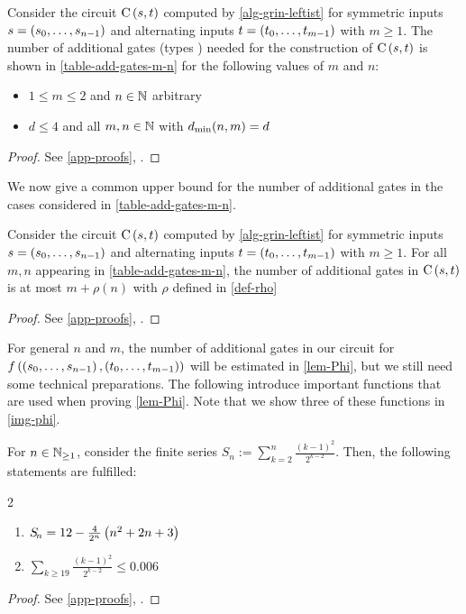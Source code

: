 \begin{lemma} \label{size-small-values}
Consider the circuit $\operatorname{C}\left({s, t}\right)$ computed by \cref{alg-grin-leftist}
for symmetric inputs $s = \left({s_0, \dotsc, s_{n-1}}\right)$ and alternating inputs $t = \left({t_0, \dotsc, t_{m-1}}\right)$
with $m \geq 1$.
The number of additional gates (types ) needed
for the construction of $\operatorname{C}\left({s, t}\right)$ is shown in \cref{table-add-gates-m-n}
for the following values of $m$ and $n$:
\begin{itemize}
 \item $1 \leq m \leq 2$ and $n \in \mathbb N$ arbitrary
 \item $d \leq 4$ and all $m, n \in \mathbb N$ with $d_{\min}(n, m) = d$
\end{itemize}
\begin{proof}
 See \cref{app-proofs}, .
\end{proof}
\end{lemma}

We now give a common upper bound for the number of additional gates
in the cases considered in \cref{table-add-gates-m-n}.

\begin{corollary} \label{add-gates-upper-bound}
Consider the circuit $\operatorname{C}\left({s, t}\right)$ computed by \cref{alg-grin-leftist}
for symmetric inputs $s = \left({s_0, \dotsc, s_{n-1}}\right)$ and alternating inputs $t = \left({t_0, \dotsc, t_{m-1}}\right)$
with $m \geq 1$.
For all $m, n$ appearing in \cref{table-add-gates-m-n},
the number of additional gates in $\operatorname{C}\left({s, t}\right)$ is at most $m + \rho(n)$
with $\rho$ defined in \cref{def-rho}
\begin{proof}
See \cref{app-proofs}, .
\end{proof}
\end{corollary}

For general $n$ and $m$, the number of additional gates
in our circuit for $f\left({\left({s_0, \dotsc, s_{n-1}}\right), \left({t_0, \dotsc, t_{m-1}}\right)}\right)$
will be estimated in \cref{lem-Phi},
but we still need some technical preparations.
The following  introduce important functions that are used
when proving \cref{lem-Phi}.
Note that we show three of these functions in \cref{img-phi}.

\begin{lemma} \label{lem-S}
For $n \in \mathbb N_{\geq 1}$,
consider the finite series $S\!_n := \sum_{k = 2}^n \frac{(k-1)^2}{2^{k-2}}$.
Then, the following statements are fulfilled:
\begin{multicols}{2}
\begin{enumerate}
 \item \label{explicit-S_n}
$S\!_n = 12 - \frac{4}{2^n} \left({n^2 + 2 n + 3}\right)$
\item \label{S_n-20}
$\sum_{k \geq 19} \frac{(k-1)^2}{2^{k-2}} \leq 0.006$
\end{enumerate}
\end{multicols}
\begin{proof}
See \cref{app-proofs}, .
\end{proof}
\end{lemma}

